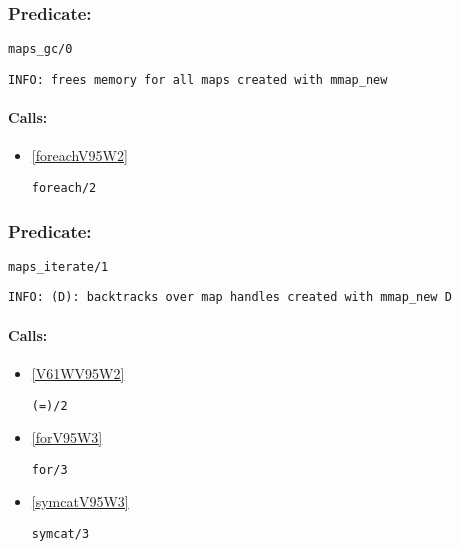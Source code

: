 \subsubsection{Predicate:} \label{mapsV95WgcV95W0}

\begin{verbatim}
maps_gc/0
\end{verbatim}

{\small \begin{verbatim}
INFO: frees memory for all maps created with mmap_new

\end{verbatim}}
\paragraph{Calls:} 
\begin{itemize}
\item \ref{foreachV95W2} 
\begin{verbatim}
foreach/2
\end{verbatim}

\end{itemize}

\subsubsection{Predicate:} \label{mapsV95WiterateV95W1}

\begin{verbatim}
maps_iterate/1
\end{verbatim}

{\small \begin{verbatim}
INFO: (D): backtracks over map handles created with mmap_new D

\end{verbatim}}
\paragraph{Calls:} 
\begin{itemize}
\item \ref{V61WV95W2} 
\begin{verbatim}
(=)/2
\end{verbatim}

\item \ref{forV95W3} 
\begin{verbatim}
for/3
\end{verbatim}

\item \ref{symcatV95W3} 
\begin{verbatim}
symcat/3
\end{verbatim}

\end{itemize}

